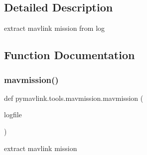 \subsection{Detailed Description}
\begin{DoxyVerb}extract mavlink mission from log
\end{DoxyVerb}
 

\subsection{Function Documentation}
\mbox{\label{namespacepymavlink_1_1tools_1_1mavmission_a3c88671acc1dd08329c20a3b3e104678}} 
\subsubsection{\texorpdfstring{mavmission()}{mavmission()}}
{\footnotesize\ttfamily def pymavlink.\+tools.\+mavmission.\+mavmission (\begin{DoxyParamCaption}\item[{}]{logfile }\end{DoxyParamCaption})}

\begin{DoxyVerb}extract mavlink mission\end{DoxyVerb}
 